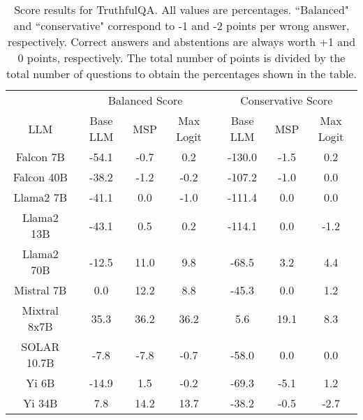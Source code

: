 \begin{table*}
\centering
\begin{tabular}{c|c|c|c|c|c|c}
& \multicolumn{3}{c|}{Balanced Score} & \multicolumn{3}{c}{Conservative Score} \\ 
LLM & Base LLM & MSP & Max Logit & Base LLM & MSP & Max Logit\\ \hline
Falcon 7B & -54.1 & -0.7 & 0.2 & -130.0 & -1.5 & 0.2\\
Falcon 40B & -38.2 & -1.2 & -0.2 & -107.2 & -1.0 & 0.0\\
Llama2 7B & -41.1 & 0.0 & -1.0 & -111.4 & 0.0 & 0.0\\
Llama2 13B & -43.1 & 0.5 & 0.2 & -114.1 & 0.0 & -1.2\\
Llama2 70B & -12.5 & 11.0 & 9.8 & -68.5 & 3.2 & 4.4\\
Mistral 7B & 0.0 & 12.2 & 8.8 & -45.3 & 0.0 & 1.2\\
Mixtral 8x7B & 35.3 & 36.2 & 36.2 & 5.6 & 19.1 & 8.3\\
SOLAR 10.7B & -7.8 & -7.8 & -0.7 & -58.0 & 0.0 & 0.0\\
Yi 6B & -14.9 & 1.5 & -0.2 & -69.3 & -5.1 & 1.2\\
Yi 34B & 7.8 & 14.2 & 13.7 & -38.2 & -0.5 & -2.7\\
\hline
\end{tabular}
\caption{Score results for TruthfulQA. All values are percentages. ``Balanced" and ``conservative" correspond to -1 and -2 points per wrong answer, respectively. Correct answers and abstentions are always worth +1 and 0 points, respectively. The total number of points is divided by the total number of questions to obtain the percentages shown in the table.}
\label{tab:truthfulqa_score}
\end{table*}

